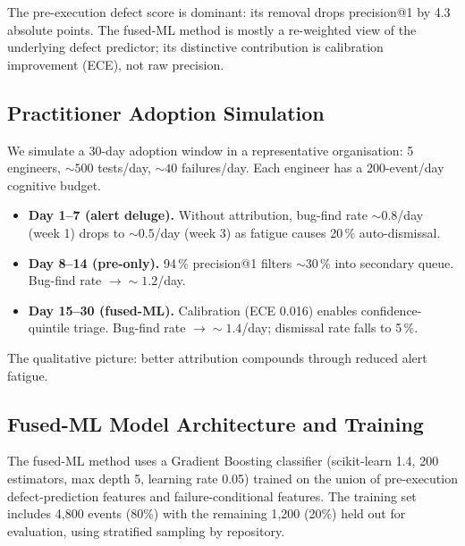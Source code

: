 \documentclass[11pt,a4paper]{article}
\begin{document}
The pre-execution defect score is dominant: its removal drops
precision@1 by 4.3 absolute points. The fused-ML method is mostly a
re-weighted view of the underlying defect predictor; its distinctive
contribution is calibration improvement (ECE), not raw precision.

\subsection{Practitioner Adoption Simulation}
\label{sec:adoption_sim}

We simulate a 30-day adoption window in a representative
organisation: 5 engineers, $\sim 500$ tests/day, $\sim 40$
failures/day. Each engineer has a 200-event/day cognitive budget.

\begin{itemize}
  \item \textbf{Day 1--7 (alert deluge).} Without attribution,
        bug-find rate $\sim 0.8$/day (week 1) drops to $\sim 0.5$/day
        (week 3) as fatigue causes 20\,\% auto-dismissal.
  \item \textbf{Day 8--14 (pre-only).} 94\,\% precision@1 filters
        $\sim$30\,\% into secondary queue. Bug-find rate
        $\rightarrow \sim 1.2$/day.
  \item \textbf{Day 15--30 (fused-ML).} Calibration (ECE 0.016)
        enables confidence-quintile triage. Bug-find rate
        $\rightarrow \sim 1.4$/day; dismissal rate falls to 5\,\%.
\end{itemize}

The qualitative picture: better attribution compounds through
reduced alert fatigue.


\subsection{Fused-ML Model Architecture and Training}
\label{sec:model_architecture}

The fused-ML method uses a Gradient Boosting classifier (scikit-learn 1.4, 200 estimators, max depth 5, learning rate 0.05) trained on the union of pre-execution defect-prediction features and failure-conditional features. The training set includes 4{,}800 events (80\%) with the remaining 1{,}200 (20\%) held out for evaluation, using stratified sampling by repository.
\end{document}

